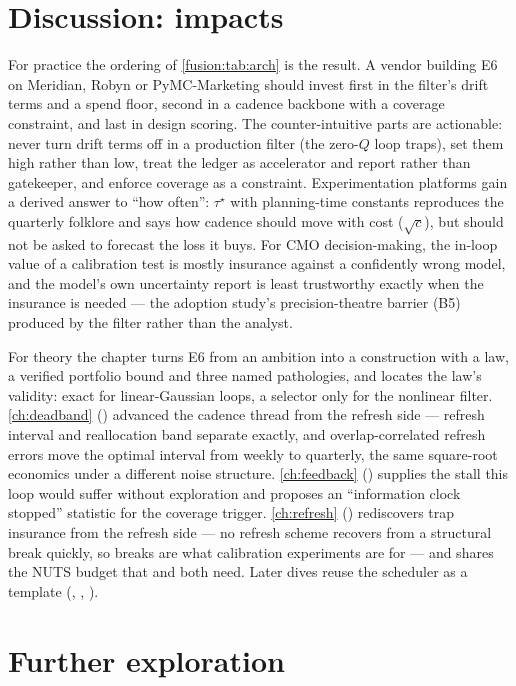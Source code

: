 \section{Discussion: impacts}

For practice the ordering of \cref{fusion:tab:arch} is the result. A vendor building E6 on Meridian, Robyn or PyMC-Marketing should invest first in the filter's drift terms and a spend floor, second in a cadence backbone with a coverage constraint, and last in design scoring. The counter-intuitive parts are actionable: never turn drift terms off in a production filter (the zero-$Q$ loop traps), set them high rather than low, treat the ledger as accelerator and report rather than gatekeeper, and enforce coverage as a constraint. Experimentation platforms gain a derived answer to ``how often'': $\tau^\star$ with planning-time constants reproduces the quarterly folklore and says how cadence should move with cost ($\sqrt c$), but should not be asked to forecast the loss it buys. For CMO decision-making, the in-loop value of a calibration test is mostly insurance against a confidently wrong model, and the model's own uncertainty report is least trustworthy exactly when the insurance is needed --- the adoption study's precision-theatre barrier (B5) produced by the filter rather than the analyst.

For theory the chapter turns E6 from an ambition into a construction with a law, a verified portfolio bound and three named pathologies, and locates the law's validity: exact for linear-Gaussian loops, a selector only for the nonlinear filter. \cref{ch:deadband} () advanced the cadence thread from the refresh side --- refresh interval and reallocation band separate exactly, and overlap-correlated refresh errors move the optimal interval from weekly to quarterly, the same square-root economics under a different noise structure. \cref{ch:feedback} () supplies the stall this loop would suffer without exploration and proposes an ``information clock stopped'' statistic for the coverage trigger. \cref{ch:refresh} () rediscovers trap insurance from the refresh side --- no refresh scheme recovers from a structural break quickly, so breaks are what calibration experiments are for --- and shares the NUTS budget that  and  both need. Later dives reuse the scheduler as a template (, , ).

\section{Further exploration}

